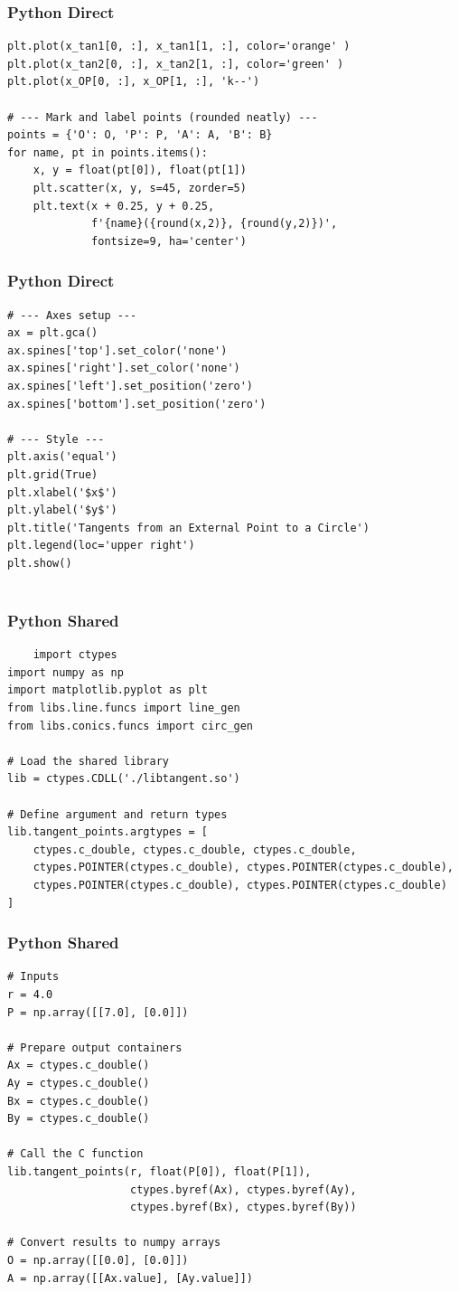 \documentclass{beamer}
\begin{document}
\begin{frame}[fragile]
\frametitle{Python Direct}
\begin{lstlisting}
plt.plot(x_tan1[0, :], x_tan1[1, :], color='orange' )
plt.plot(x_tan2[0, :], x_tan2[1, :], color='green' )
plt.plot(x_OP[0, :], x_OP[1, :], 'k--')

# --- Mark and label points (rounded neatly) ---
points = {'O': O, 'P': P, 'A': A, 'B': B}
for name, pt in points.items():
    x, y = float(pt[0]), float(pt[1])
    plt.scatter(x, y, s=45, zorder=5)
    plt.text(x + 0.25, y + 0.25,
             f'{name}({round(x,2)}, {round(y,2)})',
             fontsize=9, ha='center')
\end{lstlisting}
    
\end{frame}
\begin{frame}[fragile]
\frametitle{Python Direct}
\begin{lstlisting}
# --- Axes setup ---
ax = plt.gca()
ax.spines['top'].set_color('none')
ax.spines['right'].set_color('none')
ax.spines['left'].set_position('zero')
ax.spines['bottom'].set_position('zero')

# --- Style ---
plt.axis('equal')
plt.grid(True)
plt.xlabel('$x$')
plt.ylabel('$y$')
plt.title('Tangents from an External Point to a Circle')
plt.legend(loc='upper right')
plt.show()
    
\end{lstlisting}
    
\end{frame}
\begin{frame}[fragile]
\frametitle{Python Shared}
\begin{lstlisting}
    import ctypes
import numpy as np
import matplotlib.pyplot as plt
from libs.line.funcs import line_gen
from libs.conics.funcs import circ_gen

# Load the shared library
lib = ctypes.CDLL('./libtangent.so')

# Define argument and return types
lib.tangent_points.argtypes = [
    ctypes.c_double, ctypes.c_double, ctypes.c_double,
    ctypes.POINTER(ctypes.c_double), ctypes.POINTER(ctypes.c_double),
    ctypes.POINTER(ctypes.c_double), ctypes.POINTER(ctypes.c_double)
]
\end{lstlisting}
    
\end{frame}
\begin{frame}[fragile]
\frametitle{Python Shared}
\begin{lstlisting}
# Inputs
r = 4.0
P = np.array([[7.0], [0.0]])

# Prepare output containers
Ax = ctypes.c_double()
Ay = ctypes.c_double()
Bx = ctypes.c_double()
By = ctypes.c_double()

# Call the C function
lib.tangent_points(r, float(P[0]), float(P[1]),
                   ctypes.byref(Ax), ctypes.byref(Ay),
                   ctypes.byref(Bx), ctypes.byref(By))

# Convert results to numpy arrays
O = np.array([[0.0], [0.0]])
A = np.array([[Ax.value], [Ay.value]])
\end{lstlisting}
    
\end{frame}
\end{document}
